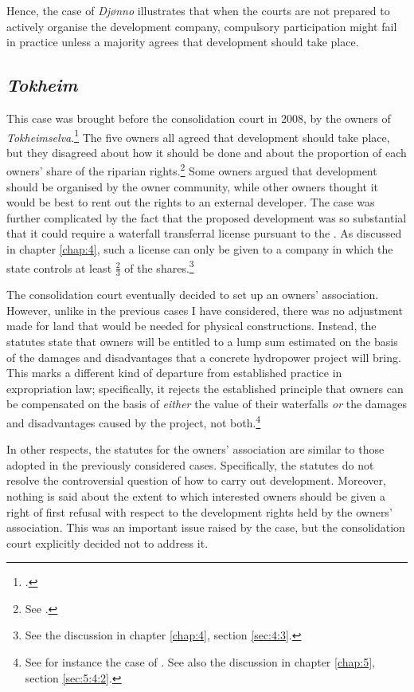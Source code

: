 Hence, the case of {\it Djønno} illustrates that when the courts are not prepared to actively organise the development company, compulsory participation might fail in practice unless a majority agrees that development should take place.

\subsection{\emph{Tokheim}}\label{sec:6:4:4}

This case was brought before the consolidation court in 2008, by the owners of \emph{Tokheimselva}.\footcite{tokheim08} The five owners all agreed that development should take place, but they disagreed about how it should be done and about the proportion of each owners' share of the riparian rights.\footnote{See \cite[34-36]{stokstad11}.} Some owners argued that development should be organised by the owner community, while other owners thought it would be best to rent out the rights to an external developer. The case was further complicated by the fact that the proposed development was so substantial that it could require a waterfall transferral license pursuant to the \cite{ica17}. As discussed in chapter \ref{chap:4}, such a license can only be given to a company in which the state controls at least $\frac{2}{3}$ of the shares.\footnote{See the discussion in chapter \ref{chap:4}, section \ref{sec:4:3}.}

The consolidation court eventually decided to set up an owners' association. However, unlike in the previous cases I have considered, there was no adjustment made for land that would be needed for physical constructions. Instead, the statutes state that owners will be entitled to a lump sum estimated on the basis of the damages and disadvantages that a concrete hydropower project will bring. This marks a different kind of departure from established practice in expropriation law; specifically, it rejects the established principle that owners can be compensated on the basis of \emph{either} the value of their waterfalls \emph{or} the damages and disadvantages caused by the project, not both.\footnote{See for instance the case of \cite{vikfalli71}. See also the discussion in chapter \ref{chap:5}, section \ref{sec:5:4:2}.}

In other respects, the statutes for the owners' association are similar to those adopted in the previously considered cases. Specifically, the statutes do not resolve the controversial question of how to carry out development. Moreover, nothing is said about the extent to which interested owners should be given a right of first refusal with respect to the development rights held by the owners' association. This was an important issue raised by the case, but the consolidation court explicitly decided not to address it. %

